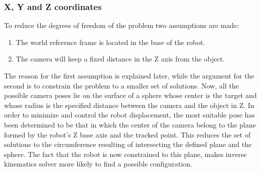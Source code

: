 	\subsubsection{X, Y and Z coordinates} %
	\label{subsub:x_y_and_z_coordinates}
	To reduce the degrees of freedom of the problem two assumptions are made:
	\begin{enumerate}
		\item The world reference frame is located in the base of the robot.
		\item The camera will keep a fixed distance in the Z axis from the object.
	\end{enumerate}
	The reason for the first assumption is explained later, while the argument for the second is to constrain the problem to a smaller set of solutions. 
	Now, all the possible camera poses lie on the surface of a sphere whose center is the target and whose radius is the specified distance between the camera and the object in Z.
	In order to minimize and control the robot displacement, the most suitable pose has been determined to be that in which the center of the camera belong to the plane formed by the robot's Z base axis and the tracked point. 
	This reduces the set of solutions to the circumference resulting of intersecting the defined plane and the sphere.
	The fact that the robot is now constrained to this plane, makes inverse kinematics solver more likely to find a possible configuration.\\

